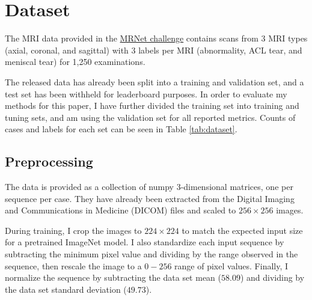 \documentclass[10pt,twocolumn,letterpaper]{article}
\begin{document}
\section{Dataset} %

The MRI data provided in the \href{https://stanfordmlgroup.github.io/competitions/mrnet/}{MRNet challenge} contains scans from 3 MRI types (axial, coronal, and sagittal) with 3 labels per MRI (abnormality, ACL tear, and meniscal tear) for 1,250 examinations.

The released data has already been split into a training and validation set, and a test set has been withheld for leaderboard purposes. In order to evaluate my methods for this paper, I have further divided the training set into training and tuning sets, and am using the validation set for all reported metrics. Counts of cases and labels for each set can be seen in Table \ref{tab:dataset}.

\subsection{Preprocessing}

The data is provided as a collection of numpy\cite{numpy} 3-dimensional matrices, one per sequence per case. They have already been extracted from the Digital Imaging and Communications in Medicine (DICOM) files and scaled to $256 \times 256$ images.

During training, I crop the images to $224 \times 224$ to match the expected input size for a pretrained ImageNet model. I also standardize each input sequence by subtracting the minimum pixel value and dividing by the range observed in the sequence, then rescale the image to a $0-256$ range of pixel values. Finally, I normalize the sequence by subtracting the data set mean ($58.09$) and dividing by the data set standard deviation ($49.73$).
\end{document}
